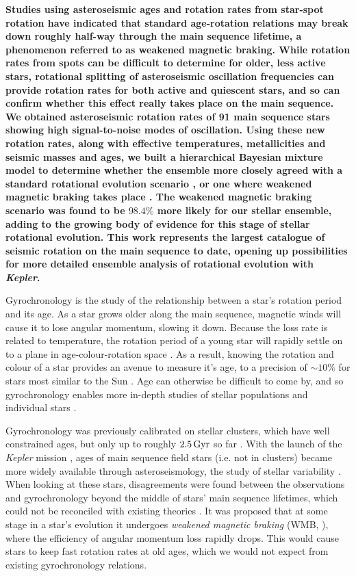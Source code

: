 \documentclass[12pt]{article}
\begin{document}
\textbf{Studies using asteroseismic ages and rotation rates from star-spot rotation have indicated that standard age-rotation relations may break down roughly half-way through the main sequence lifetime, a phenomenon referred to as weakened magnetic braking. While rotation rates from spots can be difficult to determine for older, less active stars, rotational splitting of asteroseismic oscillation frequencies can provide rotation rates for both active and quiescent stars, and so can confirm whether this effect really takes place on the main sequence.\\
We obtained asteroseismic rotation rates of 91 main sequence stars showing high signal-to-noise modes of oscillation.
Using these new rotation rates, along with effective temperatures, metallicities and seismic masses and ages, we built a hierarchical Bayesian mixture model to determine whether the ensemble more closely agreed with a standard rotational evolution scenario \cite{vansaders+pinsonneault2013}, or one where weakened magnetic braking takes place \cite{vansaders+2016}. The weakened magnetic braking scenario was found to be $98.4\%$ more likely for our stellar ensemble, adding to the growing body of evidence for this stage of stellar rotational evolution. This work represents the largest catalogue of seismic rotation on the main sequence to date, opening up possibilities for more detailed ensemble analysis of rotational evolution with \textit{Kepler}.}

Gyrochronology is the study of the relationship between a star's rotation period and its age. As a star grows older along the main sequence, magnetic winds will cause it to lose angular momentum, slowing it down. Because the loss rate is related to temperature, the rotation period of a young star will rapidly settle on to a plane in age-colour-rotation space \cite{barnes2007}. As a result, knowing the rotation and colour of a star provides an avenue to measure it's age, to a precision of $\sim 10\%$ for stars most similar to the Sun \cite{meibom+2015}. Age can otherwise be difficult to come by, and so gyrochronology enables more in-depth studies of stellar populations and individual stars \cite{leiner+2019,claytor+2019}.

Gyrochronology was previously calibrated on stellar clusters, which have well constrained ages, but only up to roughly $2.5\, \rm{Gyr}$ so far \cite{meibom+2015}. With the launch of the \textit{Kepler} mission \cite{borucki+2010}, ages of main sequence field stars (i.e. not in clusters) became more widely available through asteroseismology, the study of stellar variability \cite{silvaaguirre+2015}. When looking at these stars, disagreements were found between the observations and gyrochronology beyond the middle of stars' main sequence lifetimes, which could not be reconciled with existing theories \cite{angus+2015, nielsen+2015, davies+2015}. It was proposed that at some stage in a star's evolution it undergoes \textit{weakened magnetic braking} (WMB, \cite{vansaders+2016}), where the efficiency of angular momentum loss rapidly drops. This would cause stars to keep fast rotation rates at old ages, which we would not expect from existing gyrochronology relations.
\end{document}
